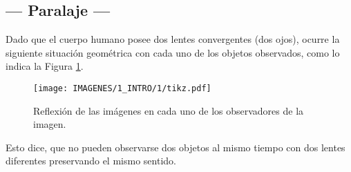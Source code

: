 \documentclass[10pt,a4paper]{article}
\begin{document}
\subsection{--- Paralaje ---} %
\label{sub:paralaje}
Dado que el cuerpo humano posee dos lentes convergentes (dos ojos), ocurre la siguiente situación geométrica con cada uno de los objetos observados, como lo indica la Figura \ref{fig:paralaje}.
\begin{figure}[ht]
	\centering
	\texttt{[image: IMAGENES/1\_INTRO/1/tikz.pdf]}
	\caption{Reflexión de las imágenes en cada uno de los observadores de la imagen.}
	\label{fig:paralaje}
\end{figure}
Esto dice, que no pueden observarse dos objetos al mismo tiempo con dos lentes diferentes preservando el mismo sentido.

\end{document}
